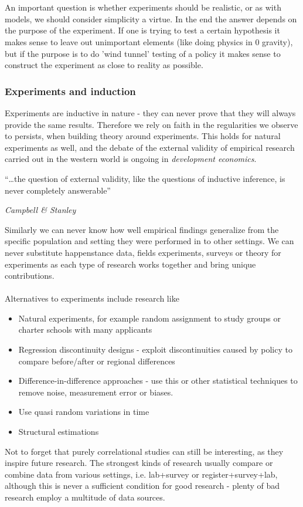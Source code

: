 \documentclass[12pt, a4paper]{article}
\begin{document}
\begin{multicols}{2}
\\ \\
An important question is whether experiments should be realistic, or as with models, we should consider simplicity a virtue. In the end the answer depends on the purpose of the experiment. If one is trying to test a certain hypothesis it makes sense to leave out unimportant elements (like doing physics in 0 gravity), but if the purpose is to do 'wind tunnel' testing of a policy it makes sense to construct the experiment as close to reality as possible. 

\subsubsection{Experiments and induction}
Experiments are inductive in nature - they can never prove that they will always provide the same results. Therefore we rely on faith in the regularities we observe to persists, when building theory around experiments. This holds for natural experiments as well, and the debate of the external validity of empirical research carried out in the western world is ongoing in \textit{development economics}. 
\epigraph{“…the question of external validity, like the questions of inductive inference, is never completely answerable”}{\textit{Campbell \& Stanley}}
Similarly we can never know how well empirical findings generalize from the specific population and setting they were performed in to other settings. We can never substitute happenstance data, fields experiments, surveys or theory for experiments as each type of research works together and bring unique contributions. 
\\ \\
Alternatives to experiments include research like 
\begin{itemize}
\item Natural experiments, for example random assignment to study groups or charter schools with many applicants
\item Regression discontinuity designs - exploit discontinuities caused by policy to compare before/after or regional differences
\item Difference-in-difference approaches - use this or other statistical techniques to remove noise, measurement error or biases. 
\item Use quasi random variations in time 
\item Structural estimations
\end{itemize}
Not to forget that purely correlational studies can still be interesting, as they inspire future research. The strongest kinds of research usually compare or combine data from various settings, i.e. lab+survey or register+survey+lab, although this is never a sufficient condition for good research - plenty of bad research employ a multitude of data sources. 

\end{multicols}
\end{document}
